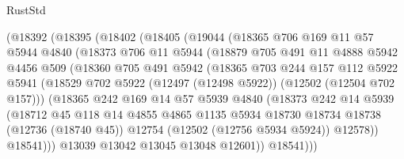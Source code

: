 \begin{lexlean}{RustStd}
\begin{coremodule}
          (@18392
            (@18395
              (@18402
                (@18405
                  (@19044
                    (@18365
                      @706
                      @169
                      @11
                      @57
                      @5944
                      @4840
                      (@18373
                        @706
                        @11
                        @5944
                        (@18879
                          @705
                          @491
                          @11
                          @4888
                          @5942
                          @4456
                          @509
                          (@18360
                            @705
                            @491
                            @5942
                            (@18365
                              @703
                              @244
                              @157
                              @112
                              @5922
                              @5941
                              (@18529
                                @702
                                @5922
                                (@12497 (@12498 @5922))
                                (@12502 (@12504 @702 @157)))
                              (@18365
                                @242
                                @169
                                @14
                                @57
                                @5939
                                @4840
                                (@18373
                                  @242
                                  @14
                                  @5939
                                  (@18712
                                    @45
                                    @118
                                    @14
                                    @4855
                                    @4865
                                    @1135
                                    @5934
                                    @18730
                                    @18734
                                    @18738
                                    (@12736 (@18740 @45))
                                    @12754
                                    (@12502 (@12756 @5934 @5924))
                                    @12578))
                                @18541)))
                          @13039
                          @13042
                          @13045
                          @13048
                          @12601))
                      @18541)))

\end{coremodule}
\end{lexlean}
